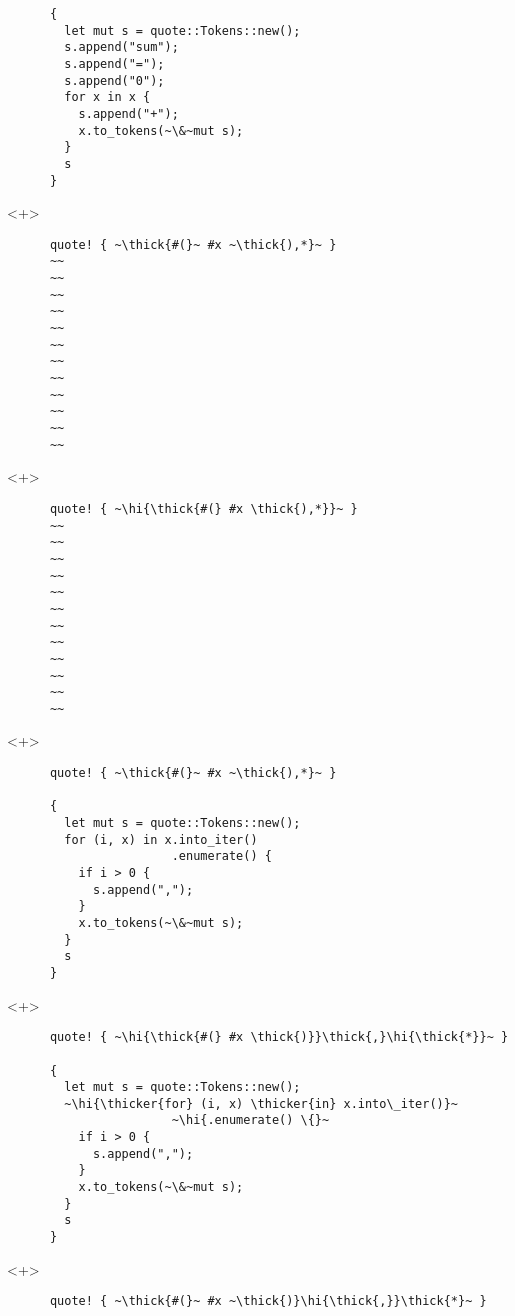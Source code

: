 \documentclass[usepdftitle=false]{beamer}
\renewcommand{\&}{\makebox[\widthof{\ampersand}][c]{\scalebox{0.9}[1.0]{\Book\ampersand}}}
\newcommand{\+}{\makebox[\widthof{+}][c]{\raisebox{-.2\height}{\scalefont{1.5}\Light+}}}
\newcommand{\thick}[1]{\contourlength{0.12pt}\contour[10]{black}{#1}}
\newcommand{\thicker}[1]{\contourlength{0.26pt}\contour[10]{black}{#1}}
\newcommand{\hi}[1]{%
\tikz[baseline=(A.base)]
 \node[highlighting=0,inner sep=0pt,text depth=0pt] (A) {#1};%
}
\begin{document}
\begin{frame}[fragile]
\begin{onlyenv}
\begin{verbatim}
      {
        let mut s = quote::Tokens::new();
        s.append("sum");
        s.append("=");
        s.append("0");
        for x in x {
          s.append("+");
          x.to_tokens(~\&~mut s);
        }
        s
      }
    \end{verbatim}
  \end{onlyenv}
\end{frame}

\begin{frame}[fragile]
  \begin{onlyenv}<+>
    \begin{verbatim}
      quote! { ~\thick{#(}~ #x ~\thick{),*}~ }
      ~~
      ~~
      ~~
      ~~
      ~~
      ~~
      ~~
      ~~
      ~~
      ~~
      ~~
      ~~
    \end{verbatim}
  \end{onlyenv}
  \begin{onlyenv}<+>
    \begin{verbatim}
      quote! { ~\hi{\thick{#(} #x \thick{),*}}~ }
      ~~
      ~~
      ~~
      ~~
      ~~
      ~~
      ~~
      ~~
      ~~
      ~~
      ~~
      ~~
    \end{verbatim}
  \end{onlyenv}
  \begin{onlyenv}<+>
    \begin{verbatim}
      quote! { ~\thick{#(}~ #x ~\thick{),*}~ }

      {
        let mut s = quote::Tokens::new();
        for (i, x) in x.into_iter()
                       .enumerate() {
          if i > 0 {
            s.append(",");
          }
          x.to_tokens(~\&~mut s);
        }
        s
      }
    \end{verbatim}
  \end{onlyenv}
  \begin{onlyenv}<+>
    \begin{verbatim}
      quote! { ~\hi{\thick{#(} #x \thick{)}}\thick{,}\hi{\thick{*}}~ }

      {
        let mut s = quote::Tokens::new();
        ~\hi{\thicker{for} (i, x) \thicker{in} x.into\_iter()}~
                       ~\hi{.enumerate() \{}~
          if i > 0 {
            s.append(",");
          }
          x.to_tokens(~\&~mut s);
        }
        s
      }
    \end{verbatim}
  \end{onlyenv}
  \begin{onlyenv}<+>
    \begin{verbatim}
      quote! { ~\thick{#(}~ #x ~\thick{)}\hi{\thick{,}}\thick{*}~ }


\end{verbatim}
\end{onlyenv}
\end{frame}
\end{document}
